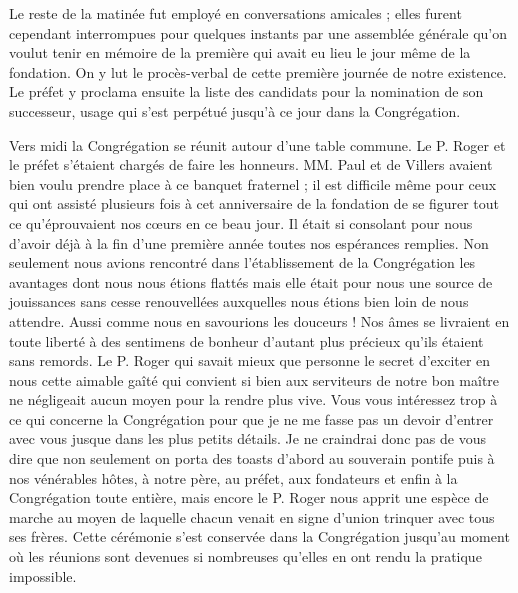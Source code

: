 Le reste de la matinée fut employé en conversations amicales ; elles furent cependant interrompues pour quelques instants par une assemblée générale qu'on voulut tenir en mémoire de la première qui avait eu lieu le jour même de la fondation. On y lut le procès-verbal de cette première journée de notre existence. Le préfet y proclama ensuite la liste des candidats
pour la nomination de son successeur, usage qui s'est perpétué jusqu'à ce jour dans la Congrégation.

Vers midi la Congrégation se réunit autour d'une table commune. Le P. Roger et le préfet s'étaient chargés de faire les honneurs. MM. Paul et de Villers avaient bien voulu prendre place à ce banquet fraternel ; il est difficile même pour ceux qui ont assisté plusieurs fois à cet anniversaire de la fondation de se figurer tout ce qu'éprouvaient nos cœurs en ce beau jour. Il était si consolant pour nous d'avoir déjà à la fin d'une première année toutes nos espérances remplies. Non seulement nous avions rencontré dans l'établissement de la Congrégation les avantages dont nous nous étions flattés mais elle était pour nous une source de jouissances sans cesse renouvellées auxquelles nous étions bien loin de nous attendre. Aussi comme nous en savourions les douceurs ! Nos âmes se livraient en toute liberté à des sentimens de bonheur d'autant plus précieux qu'ils étaient sans remords. Le P. Roger qui savait mieux que personne le secret d'exciter en nous cette aimable gaîté qui convient si bien aux serviteurs de notre bon maître ne négligeait aucun moyen pour la rendre plus vive. Vous vous intéressez trop à ce qui concerne la Congrégation pour que je ne me fasse pas un devoir d'entrer avec vous jusque dans les plus petits détails. Je ne craindrai donc pas de vous dire que non seulement on porta des toasts d'abord au souverain pontife puis à nos vénérables hôtes, à notre père, au préfet, aux fondateurs et enfin à la Congrégation toute entière, mais encore le P. Roger nous apprit une espèce de marche au moyen de laquelle chacun venait en signe d'union trinquer avec tous
ses frères. Cette cérémonie s'est conservée dans la Congrégation jusqu'au moment où les réunions sont devenues si nombreuses qu'elles en ont rendu la pratique impossible.


